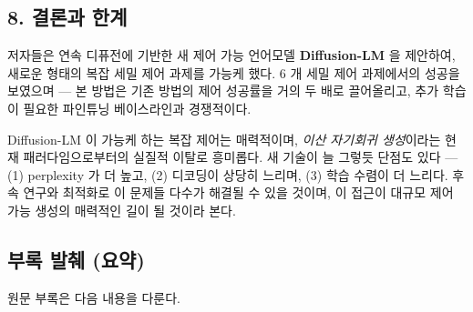 \documentclass[
]{article}
\begin{document}
\hypertarget{uxacb0uxb860uxacfc-uxd55cuxacc4}{%
\subsection{8. 결론과 한계}\label{uxacb0uxb860uxacfc-uxd55cuxacc4}}

저자들은 연속 디퓨전에 기반한 새 제어 가능 언어모델
\textbf{Diffusion-LM} 을 제안하여, 새로운 형태의 복잡 세밀 제어 과제를
가능케 했다. 6 개 세밀 제어 과제에서의 성공을 보였으며 --- 본 방법은
기존 방법의 제어 성공률을 거의 두 배로 끌어올리고, 추가 학습이 필요한
파인튜닝 베이스라인과 경쟁적이다.

Diffusion-LM 이 가능케 하는 복잡 제어는 매력적이며, \emph{이산 자기회귀
생성}이라는 현재 패러다임으로부터의 실질적 이탈로 흥미롭다. 새 기술이 늘
그렇듯 단점도 있다 --- (1) perplexity 가 더 높고, (2) 디코딩이 상당히
느리며, (3) 학습 수렴이 더 느리다. 후속 연구와 최적화로 이 문제들 다수가
해결될 수 있을 것이며, 이 접근이 대규모 제어 가능 생성의 매력적인 길이
될 것이라 본다.

\hypertarget{uxbd80uxb85d-uxbc1cuxcdcc-uxc694uxc57d}{%
\subsection{부록 발췌
(요약)}\label{uxbd80uxb85d-uxbc1cuxcdcc-uxc694uxc57d}}

원문 부록은 다음 내용을 다룬다.
\end{document}
